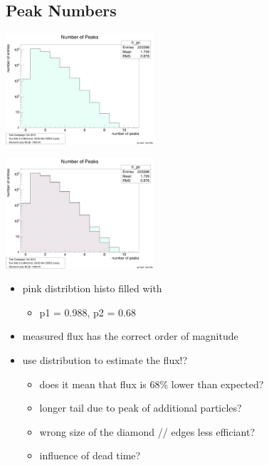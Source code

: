 \documentclass[9pt]{beamer}
\begin{document}
\subsection{Peak Numbers}
\begin{frame}
	\begin{minipage}{5.5cm}
		\centering
		\includegraphics[width=5.5cm]{PeakNumbers}
	\end{minipage}
	\hspace*{2pt}
	\begin{minipage}{5.5cm}
		\centering
		\includegraphics[width=5.5cm]{PeakNumbersEst}
	\end{minipage}\s
	\begin{itemize}
		\item pink distribtion histo filled with 
		\begin{itemize}
			\item p1 = 0.988, p2 = 0.68
		\end{itemize}
		\item measured flux has the correct order of magnitude
		\item use distribution to estimate the flux!?
		\begin{itemize}
			\item does it mean that flux is 68\% lower than expected?
			\item longer tail due to peak of additional particles?
			\item wrong size of the diamond // edges less efficiant?
			\item influence of dead time?
		\end{itemize}

	\end{itemize}
\end{frame}
\end{document}
